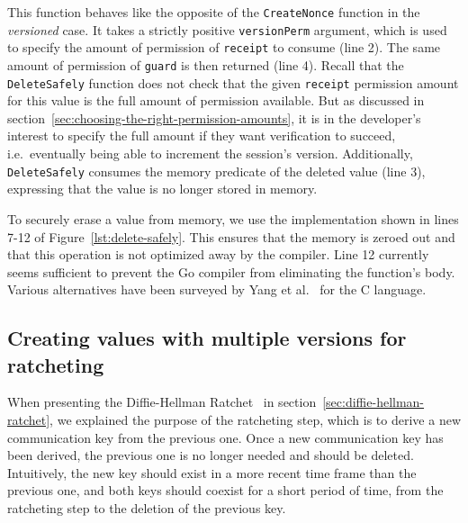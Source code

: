 This function behaves like the opposite of the \texttt{CreateNonce} function in the \emph{versioned} case.
It takes a strictly positive \texttt{versionPerm} argument, which is used to specify the amount of permission of \texttt{receipt} to consume (line 2).
The same amount of permission of \texttt{guard} is then returned (line 4).
Recall that the \texttt{DeleteSafely} function does not check that the given \texttt{receipt} permission amount for this value is the full amount of permission available.
But as discussed in section~\ref{sec:choosing-the-right-permission-amounts}, it is in the developer's interest to specify the full amount if they want verification to succeed, i.e.\ eventually being able to increment the session's version.
Additionally, \texttt{DeleteSafely} consumes the memory predicate of the deleted value (line 3), expressing that the value is no longer stored in memory.

To securely erase a value from memory, we use the implementation shown in lines 7-12 of Figure~\ref{lst:delete-safely}.
This ensures that the memory is zeroed out and that this operation is not optimized away by the compiler.
Line 12 currently seems sufficient to prevent the Go compiler from eliminating the function's body.
Various alternatives have been surveyed by Yang et al.~\cite{yang2017dead} for the C language.

\subsection{Creating values with multiple versions for ratcheting}
\label{sec:creating-values-with-multiple-versions-for-ratcheting}

When presenting the Diffie-Hellman Ratchet~\cite{perrin2016double} in section~\ref{sec:diffie-hellman-ratchet}, we explained the purpose of the ratcheting step, which is to derive a new communication key from the previous one. Once a new communication key has been derived, the previous one is no longer needed and should be deleted.
Intuitively, the new key should exist in a more recent time frame than the previous one, and both keys should coexist for a short period of time, from the ratcheting step to the deletion of the previous key.

